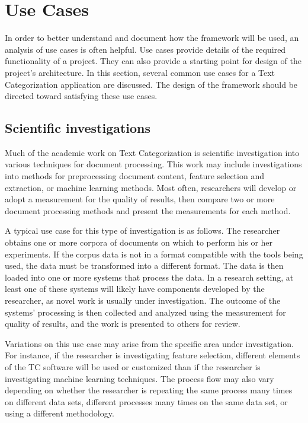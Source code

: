 \section{Use Cases}
\label{use-cases}

In order to better understand and document how the framework will be
used, an analysis of use cases is often
helpful. \cite[XXX-section]{jacobson:92} Use cases provide details of
the required functionality of a project.  They can also provide a
starting point for design of the project's architecture.  In this
section, several common use cases for a Text Categorization
application are discussed.  The design of the framework should be
directed toward satisfying these use cases.

\subsection{Scientific investigations}

Much of the academic work on Text Categorization is scientific
investigation into various techniques for document
processing.\cite{sebastiani:02} This work may include investigations
into methods for preprocessing document content, feature selection and
extraction, or machine learning methods.  Most often, researchers will
develop or adopt a measurement for the quality of results, then
compare two or more document processing methods and present the
measurements for each method.

A typical use case for this type of investigation is as follows.  The
researcher obtains one or more corpora of documents on which to
perform his or her experiments.  If the corpus data is not in a format
compatible with the tools being used, the data must be transformed
into a different format.  The data is then loaded into one or more
systems that process the data.  In a research setting, at least one of
these systems will likely have components developed by the researcher,
as novel work is usually under investigation.  The outcome of the
systems' processing is then collected and analyzed using the
measurement for quality of results, and the work is presented to
others for review.

Variations on this use case may arise from the specific area under
investigation.  For instance, if the researcher is investigating
feature selection, different elements of the TC software will be used
or customized than if the researcher is investigating machine learning
techniques.  The process flow may also vary depending on whether the
researcher is repeating the same process many times on different data
sets, different processes many times on the same data set, or using a
different methodology.

